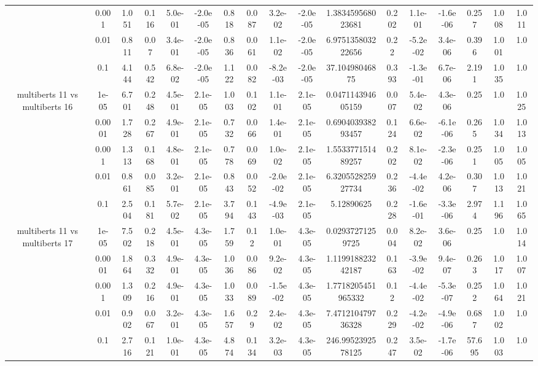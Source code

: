 \begin{tabular}{|c|c|c|c|c|c|c|c|c|c|c|c|c|c|c|c|c|}
 & 0.001 & 1.051 & 0.116 & 5.0e-01 & -2.0e-05 & 0.818 & 0.087 & 3.2e-02 & -2.0e-05 & 1.383459568023681 & 0.202 & 1.1e-01 & -1.6e-06 & 0.257 & 1.008 & 1.011 \\
 & 0.01 & 0.811 & 0.07 & 3.4e-01 & -2.0e-05 & 0.836 & 0.061 & 1.1e-02 & -2.0e-05 & 6.975135803222656 & 0.22 & -5.2e-02 & 3.4e-06 & 0.396 & 1.001 & 1.0 \\
 & 0.1 & 4.144 & 0.542 & 6.8e-02 & -2.0e-05 & 1.122 & 0.082 & -8.2e-03 & -2.0e-05 & 37.10498046875 & 0.393 & -1.3e-01 & 6.7e-06 & 2.191 & 1.035 & 1.0 \\
\hline
\multirow{5}{*}{multiberts 11 vs multiberts 16} & 1e-05 & 6.701 & 0.248 & 4.5e-01 & 2.1e-05 & 1.003 & 0.102 & 1.1e-01 & 2.1e-05 & 0.047114394605159 & 0.007 & 5.4e-02 & 4.3e-06 & 0.25 & 1.0 & 1.025 \\
 & 0.0001 & 1.728 & 0.267 & 4.9e-01 & 2.1e-05 & 0.732 & 0.066 & 1.4e-01 & 2.1e-05 & 0.690403938293457 & 0.124 & 6.6e-02 & -6.1e-06 & 0.265 & 1.034 & 1.013 \\
 & 0.001 & 1.313 & 0.168 & 4.8e-01 & 2.1e-05 & 0.778 & 0.069 & 1.0e-02 & 2.1e-05 & 1.553377151489257 & 0.202 & 8.1e-02 & -2.3e-06 & 0.251 & 1.005 & 1.005 \\
 & 0.01 & 0.861 & 0.085 & 3.2e-01 & 2.1e-05 & 0.843 & 0.052 & -2.0e-02 & 2.1e-05 & 6.320552825927734 & 0.236 & -4.4e-02 & 4.2e-06 & 0.307 & 1.013 & 1.021 \\
 & 0.1 & 2.504 & 0.181 & 5.7e-02 & 2.1e-05 & 3.794 & 0.143 & -4.9e-03 & 2.1e-05 & 5.12890625 & 0.228 & -1.6e-01 & -3.3e-06 & 2.974 & 1.196 & 1.065 \\
\hline
\multirow{5}{*}{multiberts 11 vs multiberts 17} & 1e-05 & 7.502 & 0.218 & 4.5e-01 & 4.3e-05 & 1.759 & 0.12 & 1.0e-01 & 4.3e-05 & 0.02937271259725 & 0.004 & 8.2e-02 & 3.6e-06 & 0.25 & 1.0 & 1.014 \\
 & 0.0001 & 1.864 & 0.332 & 4.9e-01 & 4.3e-05 & 1.036 & 0.086 & 9.2e-02 & 4.3e-05 & 1.119918823242187 & 0.163 & -3.9e-02 & 9.4e-07 & 0.263 & 1.017 & 1.007 \\
 & 0.001 & 1.309 & 0.216 & 4.9e-01 & 4.3e-05 & 1.033 & 0.089 & -1.5e-02 & 4.3e-05 & 1.7718205451965332 & 0.12 & -4.4e-02 & -5.3e-07 & 0.252 & 1.064 & 1.021 \\
 & 0.01 & 0.902 & 0.067 & 3.2e-01 & 4.3e-05 & 1.657 & 0.29 & 2.4e-02 & 4.3e-05 & 7.471210479736328 & 0.229 & -4.2e-02 & -4.9e-06 & 0.687 & 1.002 & 1.0 \\
 & 0.1 & 2.716 & 0.121 & 1.0e-01 & 4.3e-05 & 4.874 & 0.134 & 3.2e-03 & 4.3e-05 & 246.9952392578125 & 0.247 & 3.5e-02 & -1.7e-06 & 57.695 & 1.003 & 1.0 \\

\end{tabular}
